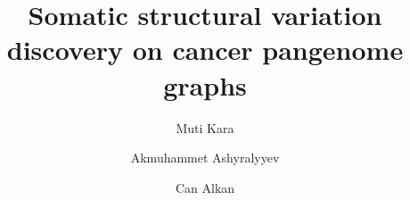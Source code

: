 \documentclass[11pt,letterpaper]{article}
\begin{document}
\thispagestyle{empty}

\title{Somatic structural variation discovery on cancer pangenome graphs}

\setcounter{Maxaffil}{2}
\author[1]{Muti Kara}
\author[1]{Akmuhammet Ashyralyyev}
\author[1\thanks{Corresponding author. Email: \href{calkan@cs.bilkent.edu.tr}{calkan@cs.bilkent.edu.tr}}]{Can Alkan}

\date{}

\maketitle



\clearpage











\clearpage





\end{document}
